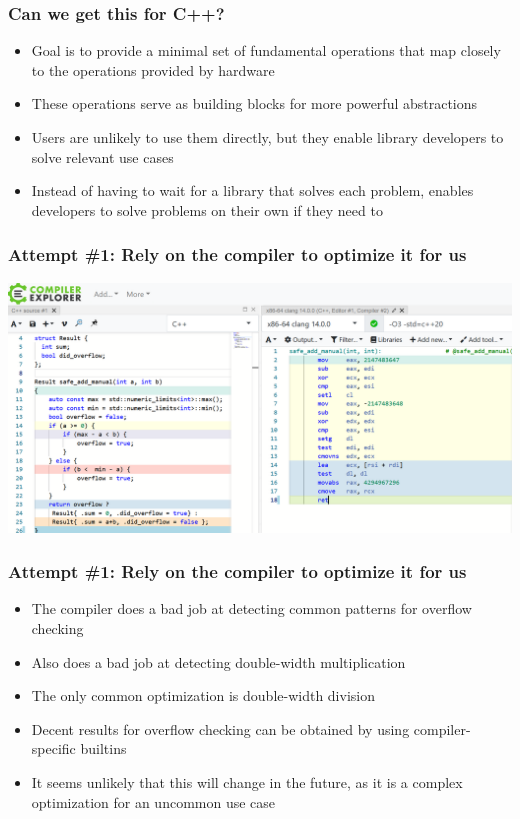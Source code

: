 \documentclass[aspectratio=169]{beamer}
\newif\iftransitions
\begin{document}
\begin{frame}
  \frametitle{Can we get this for C++?}

  \begin{itemize}
    \item Goal is to provide a minimal set of fundamental operations that map closely to the operations provided by hardware  \iftransitions \pause \fi 
    \item These operations serve as building blocks for more powerful abstractions  \iftransitions \pause \fi 
    \item Users are unlikely to use them directly, but they enable library developers to solve relevant use cases  \iftransitions \pause \fi 
    \item Instead of having to wait for a library that solves each problem, enables developers to solve problems on their own if they need to
  \end{itemize}
\end{frame}

\begin{frame}
  \frametitle{Attempt \#1: Rely on the compiler to optimize it for us}

  \iftransitions \pause \fi 
  \includegraphics[width=.95\textwidth]{arithgfx/add_cpp_overflow.png}
\end{frame}

\begin{frame}
  \frametitle{Attempt \#1: Rely on the compiler to optimize it for us}

  \begin{itemize}
    \item The compiler does a bad job at detecting common patterns for overflow checking  \iftransitions \pause \fi 
    \item Also does a bad job at detecting double-width multiplication  \iftransitions \pause \fi 
    \item The only common optimization is double-width division  \iftransitions \pause \fi 
    \item Decent results for overflow checking can be obtained by using compiler-specific builtins  \iftransitions \pause \fi 
    \item It seems unlikely that this will change in the future, as it is a complex optimization for an uncommon use case
  \end{itemize}
\end{frame}
\end{document}
